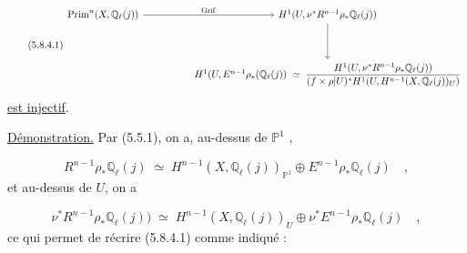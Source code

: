 \begin{equation}\tag{5.8.4.1}
\begin{tikzcd}[row sep=huge, column sep=huge]
\mathrm{Prim}^n(X,\mathbb{Q}_\ell(j)) \arrow[r, "\mathrm{Grif}"] & H^1(U,\nu^*R^{n-1}\rho_*\mathbb{Q}_\ell(j)) \arrow[d] \\
 {} & H^1(U,E^{n-1}\rho_*(\mathbb{Q}_\ell(j)) \;\simeq\; \dfrac{H^1(U,\nu^*R^{n-1}\rho_*\mathbb{Q}_\ell(j))}{(f\times\rho|U)^*H^1(U,H^{n-1}(X,\mathbb{Q}_\ell(j))_U)}
\end{tikzcd}
\end{equation}
\underline{est injectif}.



\underline{Démonstration.} Par (5.5.1), on a, au-dessus de $\mathbb{P}^1$ ,

\begin{equation}\tag{5.8.4.2}
R^{n-1}\rho_*\mathbb{Q}_\ell(j) \;\simeq\; H^{n-1}(X,\mathbb{Q}_\ell(j))_{\mathbb{P}^1} \oplus E^{n-1}\rho_*\mathbb{Q}_\ell(j) \quad ,
\end{equation}
et au-dessus de $U$, on a

\begin{equation}\tag{5.8.4.3}
\nu^*R^{n-1}\rho_*\mathbb{Q}_\ell(j)) \;\simeq\; H^{n-1}(X,\mathbb{Q}_\ell(j))_U \oplus \nu^*E^{n-1}\rho_*\mathbb{Q}_\ell(j) \quad ,
\end{equation}
ce qui permet de récrire (5.8.4.1) comme indiqué :


